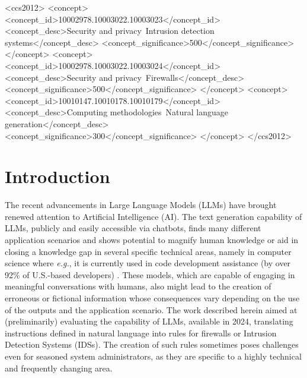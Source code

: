 \documentclass[sigconf]{acmart}
\begin{document}
\begin{CCSXML}
<ccs2012>
   <concept>
       <concept_id>10002978.10003022.10003023</concept_id>
       <concept_desc>Security and privacy~Intrusion detection systems</concept_desc>
       <concept_significance>500</concept_significance>
   </concept>
   <concept>
       <concept_id>10002978.10003022.10003024</concept_id>
       <concept_desc>Security and privacy~Firewalls</concept_desc>
       <concept_significance>500</concept_significance>
   </concept>
   <concept>
       <concept_id>10010147.10010178.10010179</concept_id>
       <concept_desc>Computing methodologies~Natural language generation</concept_desc>
       <concept_significance>300</concept_significance>
   </concept>
 </ccs2012>
\end{CCSXML}



\maketitle

\section{Introduction}\label{sec:intro}
The recent advancements in Large Language Models (LLMs) have brought renewed attention to Artificial Intelligence (AI). The text generation capability of LLMs, publicly and easily accessible via chatbots, finds many different application scenarios \cite{Kaddour23, Okonkwo21, Reis20} and shows potential to magnify human knowledge or aid in closing a knowledge gap in several specific technical areas, namely in computer science where \textit{e.g.}, it is currently used in code development assistance (by over 92\% of U.S.-based developers) \cite{Shani23}. These models, which are capable of engaging in meaningful conversations with humans, also might lead to the creation of erroneous or fictional information \cite{Chen23, Kabir23} whose consequences vary depending on the use of the outputs and the application scenario. The work described herein aimed at (preliminarily) evaluating the capability of LLMs, available in 2024, translating instructions defined in natural language into rules for firewalls or Intrusion Detection Systems (IDSs). The creation of such rules sometimes poses challenges even for seasoned system administrators, as they are specific to a highly technical and frequently changing area.
\end{document}

